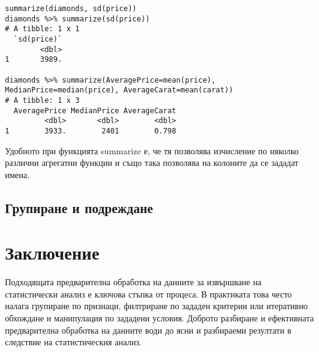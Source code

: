 \begin{lstlisting}[caption=Обобщаваща информация, label=listing0122]
summarize(diamonds, sd(price))
diamonds %>% summarize(sd(price))
# A tibble: 1 x 1
  `sd(price)`
        <dbl>
1       3989.

diamonds %>% summarize(AveragePrice=mean(price), MedianPrice=median(price), AverageCarat=mean(carat))
# A tibble: 1 x 3
  AveragePrice MedianPrice AverageCarat
         <dbl>       <dbl>        <dbl>
1        3933.        2401        0.798
\end{lstlisting}

Удобното при функцията summarize е, че тя позволява изчисление по няколко различни агрегатни функции и също така позволява на колоните да се зададат имена. 

\subsection{Групиране и подреждане}

\section*{Заключение}

Подходящата предварителна обработка на данните за извършване на статистически анализ е ключова стъпка от процеса. В практиката това често налага групиране по признаци, филтриране по зададен критерии или итеративно обхождане и манипулация по зададени условия. Доброто разбиране и ефективната предварителна обработка на данните води до ясни и разбираеми резултати в следствие на статистическия анализ. 

